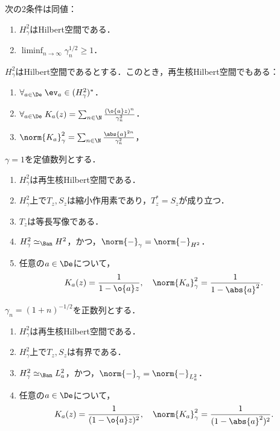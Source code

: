 \documentclass[uplatex,dvipdfmx]{jsreport}
\begin{document}
\begin{theorem}
    次の2条件は同値：
    \begin{enumerate}
        \item $H^2_\gamma$はHilbert空間である．
        \item $\liminf_{n\to\infty}\gamma_n^{1/2}\ge1$．
    \end{enumerate}
\end{theorem}

\begin{theorem}
    $H^2_\gamma$はHilbert空間であるとする．このとき，再生核Hilbert空間でもある：
    \begin{enumerate}
        \item $\forall_{a\in\De}\;\ev_a\in(H^2_\gamma)^*$．
        \item $\forall_{a\in\De}\;K_a(z)=\sum_{n\in\N}\frac{(\o{a}z)^n}{\gamma_n^2}$．
        \item $\norm{K_a}^2_\gamma=\sum_{n\in\N}\frac{\abs{a}^{2n}}{\gamma_n^2}$，
    \end{enumerate}
\end{theorem}

\begin{corollary}[Hardy空間の性質]
    $\gamma=1$を定値数列とする．
    \begin{enumerate}
        \item $H_\gamma^2$は再生核Hilbert空間である．
        \item $H^2_\gamma$上で$T_z,S_z$は縮小作用素であり，$T^*_z=S_z$が成り立つ．
        \item $T_z$は等長写像である．
        \item $H^2_\gamma\simeq_\Ban H^2$，かつ，$\norm{-}_\gamma=\norm{-}_{H^2}$．
        \item 任意の$a\in\De$について，
        \[K_a(z)=\frac{1}{1-\o{a}z},\quad\norm{K_a}_\gamma^2=\frac{1}{1-\abs{a}^2}.\]
    \end{enumerate}
\end{corollary}

\begin{corollary}[Bregman空間の性質]
    $\gamma_n=(1+n)^{-1/2}$を正数列とする．
    \begin{enumerate}
        \item $H_\gamma^2$は再生核Hilbert空間である．
        \item $H^2_\gamma$上で$T_z,S_z$は有界である．
        \item $H^2_\gamma\simeq_\Ban L_a^2$，かつ，$\norm{-}_\gamma=\norm{-}_{L_a^2}$．
        \item 任意の$a\in\De$について，
        \[K_a(z)=\frac{1}{(1-\o{a}z)^2},\quad\norm{K_a}_\gamma^2=\frac{1}{(1-\abs{a}^2)^2}.\]
    \end{enumerate}
\end{corollary}
\end{document}
